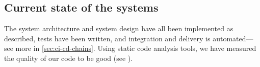 \subsection{Current state of the systems}
The system architecture and system design have all been implemented as described, tests have been written, and integration and delivery is automated---see more in \autoref{sec:ci-cd-chains}. Using static code analysis tools, we have measured the quality of our code to be good (see ).
